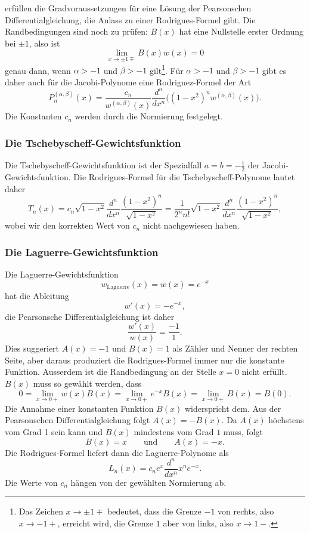 erfüllen die Gradvoraussetzungen für eine Lösung der Pearsonschen
Differentialgleichung, die Anlass zu einer Rodrigues-Formel gibt.
Die Randbedingungen sind noch zu prüfen: $B(x)$ hat eine Nullstelle
erster Ordnung bei $\pm1$, also ist
\[
\lim_{x\to \pm1\mp} B(x)w(x) = 0
\]
genau dann, wenn $\alpha>-1$ und $\beta>-1$ gilt\footnote{%
Das Zeichen $x\to\pm1\mp$ bedeutet, dass die Grenze $-1$ von rechts,
also $x\to-1+$, erreicht wird, die Grenze $1$ aber von links, also
$x\to 1-$.
}.
Für $\alpha>-1$ und $\beta>-1$ gibt es daher auch für die Jacobi-Polynome
eine Rodriguez-Formel der Art
\[
P^{(\alpha,\beta)}_n(x)
=
\frac{c_n}{w^{(\alpha,\beta)}(x)}
\frac{d^n}{dx^n}
\bigl((1-x^2)^{n} w^{(\alpha,\beta)}(x)\bigr).
\]
Die Konstanten $c_n$ werden durch die Normierung
festgelegt.

%
%
\subsubsection{Die Tschebyscheff-Gewichtsfunktion}
Die Tschebyscheff-Gewichtsfunktion ist der Spezialfall $a=b=-\frac12$
der Jacobi-Gewichtsfunktion.
%
%
Die Rodrigues-Formel für die Tschebyscheff-Polynome lautet daher
\[
T_n(x)
=
c_n\sqrt{1-x^2} \frac{d^n}{dx^n}
\frac{(1-x^2)^n}{\sqrt{1-x^2}}
=
\frac{1}{2^nn!} \sqrt{1-x^2}
\frac{d^n}{dx^n} 
\frac{(1-x^2)^n}{\sqrt{1-x^2}},
\]
wobei wir den korrekten Wert von $c_n$ nicht nachgewiesen haben.

%
%
\subsubsection{Die Laguerre-Gewichtsfunktion}
Die Laguerre-Gewichtsfunktion
%
%
\[
w_{\text{Laguerre}}(x)
=
w(x)
=
e^{-x}
\]
hat die Ableitung
\[
w'(x) = -e^{-x},
\]
die Pearsonsche Differentialgleichung ist daher
%
%
\[
\frac{w'(x)}{w(x)}=\frac{-1}{1}.
\]
Dies suggeriert $A(x)=-1$ und $B(x)=1$ als Zähler und Nenner der rechten
Seite, aber daraus produziert die Rodrigues-Formel immer nur die konstante
Funktion.
Ausserdem ist die Randbedingung an der Stelle $x=0$ nicht erfüllt.
$B(x)$ muss so gewählt werden, dass
\[
0
=
\lim_{x\to 0+} w(x)B(x)
= 
\lim_{x\to 0+} e^{-x}B(x)
=
\lim_{x\to 0+} B(x)
=
B(0).
\]
Die Annahme einer konstanten Funktion $B(x)$ widerspricht dem.
Aus der Pearsonschen Differentialgleichung folgt $A(x)=-B(x)$.
Da $A(x)$ höchstens vom Grad 1 sein kann und $B(x)$ mindestens
vom Grad $1$ muss, folgt
\[
B(x) = x
\qquad\text{und}\qquad
A(x) = -x.
\]
Die Rodrigues-Formel liefert dann die Laguerre-Polynome als
\[
L_n(x) = c_n e^x \frac{d^n}{dx^n} x^ne^{-x}.
\]
Die Werte von $c_n$ hängen von der gewählten Normierung ab.

